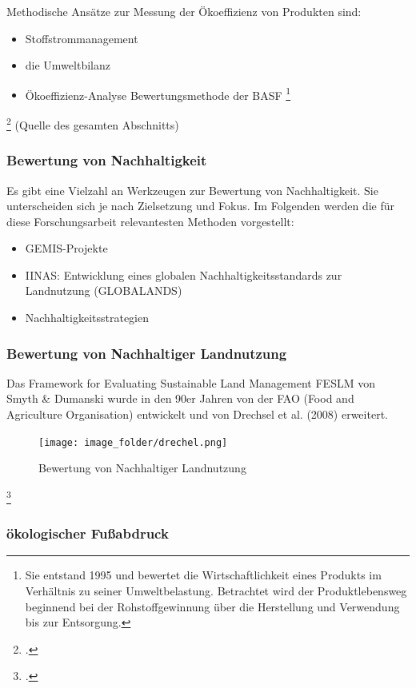 \documentclass{scrartcl}
\begin{document}
Methodische Ansätze zur Messung der Ökoeffizienz von Produkten sind:
\begin{itemize}
\item Stoffstrommanagement
\item die Umweltbilanz
\item Ökoeffizienz-Analyse Bewertungsmethode der BASF \footnote{Sie entstand 1995 und bewertet die Wirtschaftlichkeit eines Produkts im Verhältnis zu seiner Umweltbelastung. Betrachtet wird der Produktlebensweg beginnend bei der Rohstoffgewinnung über die Herstellung und Verwendung bis zur Entsorgung.}
\end{itemize}
\footcite{DefinitionWirtschaftslexikonc} (Quelle des gesamten Abschnitts)

\subsubsection{Bewertung von Nachhaltigkeit}
Es gibt eine Vielzahl an Werkzeugen zur Bewertung von Nachhaltigkeit. Sie unterscheiden sich je nach Zielsetzung und Fokus. Im Folgenden werden die für diese Forschungsarbeit relevantesten Methoden vorgestellt: 

\begin{itemize}
-Analyse und SEEBALANCE®
\item GEMIS-Projekte
\item IINAS: Entwicklung eines globalen Nachhaltigkeitsstandards zur Landnutzung (GLOBALANDS)
\item Nachhaltigkeitsstrategien
\end{itemize}

\subsubsection{Bewertung von Nachhaltiger Landnutzung}
Das Framework for Evaluating Sustainable Land Management FESLM von Smyth & Dumanski wurde in den 90er Jahren von der FAO (Food and Agriculture Organisation) entwickelt und von Drechsel et al. (2008) erweitert.
\begin{figure}[h]
\centering
\texttt{[image: image\_folder/drechel.png]}
\caption{Bewertung von Nachhaltiger Landnutzung}
\label{fig:Bewertung von Nachhaltiger Landnutzung}
\end{figure}\footcite{TobiasSpringDerBasel-Stadt, S.17}

\subsubsection{ökologischer Fußabdruck}
\end{document}
